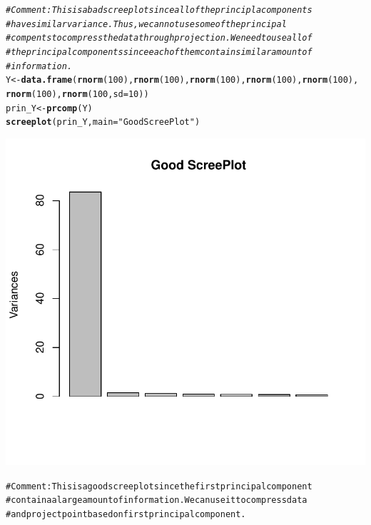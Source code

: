 \documentclass{article}\usepackage[]{graphicx}\usepackage[]{color}
\makeatletter
\def\maxwidth{ %
  \ifdim\Gin@nat@width>\linewidth
    \linewidth
  \else
    \Gin@nat@width
  \fi
}
\newcommand{\hlnum}[1]{\textcolor[rgb]{0.686,0.059,0.569}{#1}}%
\newcommand{\hlstr}[1]{\textcolor[rgb]{0.192,0.494,0.8}{#1}}%
\newcommand{\hlcom}[1]{\textcolor[rgb]{0.678,0.584,0.686}{\textit{#1}}}%
\newcommand{\hlstd}[1]{\textcolor[rgb]{0.345,0.345,0.345}{#1}}%
\newcommand{\hlkwb}[1]{\textcolor[rgb]{0.69,0.353,0.396}{#1}}%
\newcommand{\hlkwc}[1]{\textcolor[rgb]{0.333,0.667,0.333}{#1}}%
\newcommand{\hlkwd}[1]{\textcolor[rgb]{0.737,0.353,0.396}{\textbf{#1}}}%
\newenvironment{kframe}{%
 \def\at@end@of@kframe{}%
 \ifinner\ifhmode%
  \def\at@end@of@kframe{\end{minipage}}%
  \begin{minipage}{\columnwidth}%
 \fi\fi%
 \def\FrameCommand##1{\hskip\@totalleftmargin \hskip-\fboxsep
 \colorbox{shadecolor}{##1}\hskip-\fboxsep
     \hskip-\linewidth \hskip-\@totalleftmargin \hskip\columnwidth}%
 \MakeFramed {\advance\hsize-\width
   \@totalleftmargin\z@ \linewidth\hsize
   \@setminipage}}%
 {\par\unskip\endMakeFramed%
 \at@end@of@kframe}
\newenvironment{knitrout}{}{} %
\makeatother
\begin{document}
\begin{knitrout}
\begin{kframe}\begin{alltt}
\hlcom{# Comment: This is a bad screeplot since all of the principla components}
\hlcom{# have similar variance. Thus, we can not use some of the principal}
\hlcom{# compents to compress the data through projection.We need to use all of}
\hlcom{# the principal components since each of them contain similar amount of}
\hlcom{# information.}
\hlstd{Y} \hlkwb{<-} \hlkwd{data.frame}\hlstd{(}\hlkwd{rnorm}\hlstd{(}\hlnum{100}\hlstd{),} \hlkwd{rnorm}\hlstd{(}\hlnum{100}\hlstd{),} \hlkwd{rnorm}\hlstd{(}\hlnum{100}\hlstd{),} \hlkwd{rnorm}\hlstd{(}\hlnum{100}\hlstd{),} \hlkwd{rnorm}\hlstd{(}\hlnum{100}\hlstd{),}
    \hlkwd{rnorm}\hlstd{(}\hlnum{100}\hlstd{),} \hlkwd{rnorm}\hlstd{(}\hlnum{100}\hlstd{,} \hlkwc{sd} \hlstd{=} \hlnum{10}\hlstd{))}
\hlstd{prin_Y} \hlkwb{<-} \hlkwd{prcomp}\hlstd{(Y)}
\hlkwd{screeplot}\hlstd{(prin_Y,} \hlkwc{main} \hlstd{=} \hlstr{"Good ScreePlot"}\hlstd{)}
\end{alltt}
\end{kframe}

{\centering \includegraphics[width=\maxwidth]{figure/minimal-Problem_42} 

}


\begin{kframe}\begin{alltt}
# Comment: This is a good screeplot since the first principal component
# containa a large amount of information. We can use it to compress data
# and project point based on first principal component.
\end{alltt}
\end{kframe}
\end{knitrout}
\end{document}
